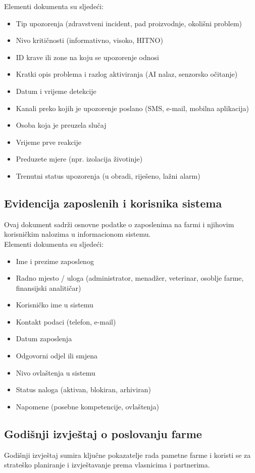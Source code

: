 \documentclass{article}
\begin{document}
\noindent Elementi dokumenta su sljedeći:
\begin{itemize}
    \item Tip upozorenja (zdravstveni incident, pad proizvodnje, okolišni problem)
    \item Nivo kritičnosti (informativno, visoko, HITNO)
    \item ID krave ili zone na koju se upozorenje odnosi
    \item Kratki opis problema i razlog aktiviranja (AI nalaz, senzorsko očitanje)
    \item Datum i vrijeme detekcije
    \item Kanali preko kojih je upozorenje poslano (SMS, e-mail, mobilna aplikacija)
    \item Osoba koja je preuzela slučaj
    \item Vrijeme prve reakcije
    \item Preduzete mjere (npr. izolacija životinje)
    \item Trenutni status upozorenja (u obradi, riješeno, lažni alarm)
\end{itemize}

\subsection*{Evidencija zaposlenih i korisnika sistema}
Ovaj dokument sadrži osnovne podatke o zaposlenima na farmi i njihovim korisničkim nalozima u informacionom sistemu. \\

\noindent Elementi dokumenta su sljedeći:
\begin{itemize}
    \item Ime i prezime zaposlenog
    \item Radno mjesto / uloga (administrator, menadžer, veterinar, osoblje farme, finansijski analitičar)
    \item Korisničko ime u sistemu
    \item Kontakt podaci (telefon, e-mail)
    \item Datum zaposlenja
    \item Odgovorni odjel ili smjena
    \item Nivo ovlaštenja u sistemu
    \item Status naloga (aktivan, blokiran, arhiviran)
    \item Napomene (posebne kompetencije, ovlaštenja)
\end{itemize}

\subsection*{Godišnji izvještaj o poslovanju farme}
Godišnji izvještaj sumira ključne pokazatelje rada pametne farme i koristi se za strateško planiranje i izvještavanje prema vlasnicima i partnerima. \\
\end{document}
